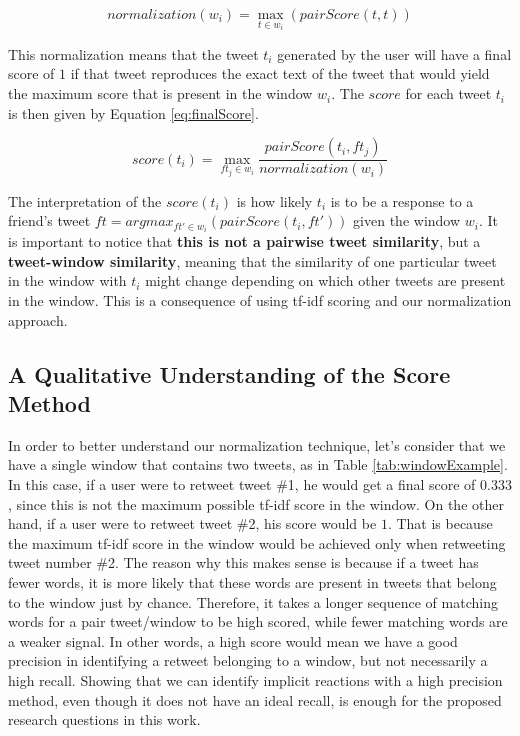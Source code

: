 \begin{equation}
normalization(w_i) = \max_{t \in w_i}(pairScore(t,t))
\label{eq:normalization}
\end{equation}

This normalization means that the tweet $t_i$ generated by the user will have a final score of $1$ if that tweet reproduces the exact text of the tweet that would yield the maximum score that is present in the window $w_i$. The $score$ for each tweet $t_i$ is then given by Equation \ref{eq:finalScore}.

\begin{equation}
score(t_i) =  \max_{ft_j \in w_i}\frac{pairScore(t_i,ft_j)}{normalization(w_i)}
\label{eq:finalScore}
\end{equation}

The interpretation of the $score(t_i)$ is how likely $t_i$ is to be a response to a friend's tweet $ft = argmax_{ft' \in w_i}(pairScore(t_i,ft'))$ given the window $w_i$. It is important to notice that \textbf{this is not a pairwise tweet similarity}, but a \textbf{tweet-window similarity}, meaning that the similarity of one particular tweet in the window with $t_i$ might change depending on which other tweets are present in the window. This is a consequence of using tf-idf scoring and our normalization approach. 

\subsection{A Qualitative Understanding of the Score Method}

In order to better understand our normalization technique, let's consider that we have a single window that contains two tweets, as in Table \ref{tab:windowExample}. In this case, if a user were to retweet tweet \#1, he would get a final score of $0.333$, since this is not the maximum possible tf-idf score in the window. On the other hand, if a user were to retweet tweet \#2, his score would be $1$. That is because the maximum tf-idf score in the window would be achieved only when retweeting tweet number \#2. The reason why this makes sense is because if a tweet has fewer words, it is more likely that these words are present in tweets that belong to the window just by chance. Therefore, it takes a longer sequence of matching words for a pair tweet/window to be high scored, while fewer matching words are a weaker signal. In other words, a high score would mean we have a good precision in identifying a retweet belonging to a window, but not necessarily a high recall. Showing that we can identify implicit reactions with a high precision method, even though it does not have an ideal recall, is enough for the proposed research questions in this work.

